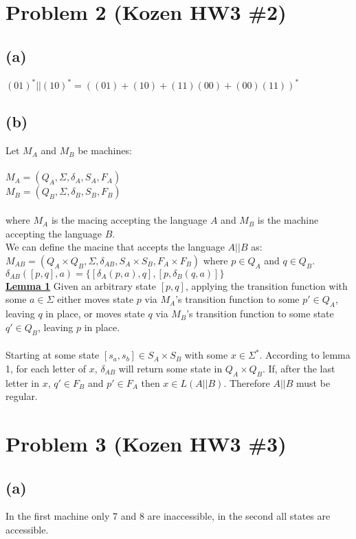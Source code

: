 \documentclass[11pt, a4paper, oneside]{article}
\begin{document}
\section*{Problem 2 (Kozen HW3 \#2)}
\subsection*{(a)}
$(01)^* || (10)^* = ((01) + (10) + (11)(00) + (00)(11))^*$

\subsection*{(b)}
Let $M_A$ and $M_B$ be machines: \\
\\
$M_A = (Q_A, \Sigma, \delta _A, S_A, F_A)$\\
$M_B = (Q_B, \Sigma, \delta _B, S_B, F_B)$\\
\\
where $M_A$ is the macing accepting the language $A$ and $M_B$ is the machine
accepting the language $B$. \\
We can define the macine that accepts the language $A||B$ as: \\

$M_{AB} = (Q_A \times Q_B, \Sigma, \delta _{AB}, S_A \times S_B, F_A \times F_B)$ 
where $p \in Q_A$ and $q \in Q_B$. \\

$\delta _{AB} ([p,q],a) = \{[\delta _A (p,a),q],[p, \delta _B (q,a)]\}$\\

\textbf{\underline{Lemma 1}}
Given an arbitrary state $[p,q]$, applying the transition function with 
some $a \in \Sigma$ either moves state $p$ via $M_A$'s transition function
to some $p' \in Q_A$, leaving $q$ in place, or moves state $q$ via $M_B$'s
transition function to some state $q' \in Q_B$, leaving $p$ in place.\\
\\
Starting at some state $[s_a, s_b] \in S_A \times S_B$ with some $x \in \Sigma^*$.
According to lemma 1, for each letter of $x$, $\delta _{AB}$ will return some 
state in $Q_A \times Q_B$. If, after the last letter in $x$, $q' \in F_B$ and 
$p' \in F_A$ then $x \in L(A||B)$. Therefore $A||B$ must be regular.


\section*{Problem 3 (Kozen HW3 \#3)}
\subsection*{(a)}
In the first machine only 7 and 8 are inaccessible, in the second all states 
are accessible.
\end{document}
